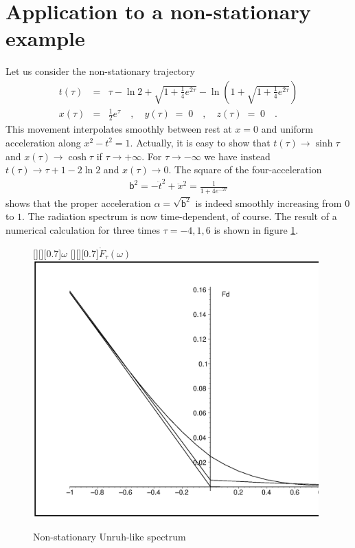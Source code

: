 \documentclass[a4paper,12pt]{article}
\newcommand{\Fd}{\dot F_{\tau}(\omega)}
\newcommand{\vvb}{\mathsf b}
\begin{document}
\section{Application to a non-stationary example}

Let us consider the non-stationary trajectory
\begin{eqnarray}
\label{eq:nonstat}
t(\tau)&=&\tau-\ln2+\sqrt{1+\frac{1}{4}e^{2\tau}}-
\ln\left(1+\sqrt{1+\frac{1}{4}e^{2\tau}}\right)\nonumber\\
x(\tau)&=&\frac{1}{2}e^\tau\quad,\quad y(\tau)\;=\;0\quad,\quad z(\tau)\;=\;0
\quad.
\end{eqnarray}
This movement interpolates smoothly between rest at $x=0$ and uniform acceleration along
$x^2-t^2=1$. Actually, it is easy to show that $t(\tau)\to\sinh\tau$ and 
$x(\tau)\to\cosh\tau$ if $\tau\to +\infty$. For $\tau\to -\infty$ we have instead
$t(\tau)\to \tau+1-2\ln2$ and $x(\tau)\to0$. The square of the four-acceleration
\begin{eqnarray*}
\vvb^2=-\ddot{t}^2+\ddot{x}^2=\frac{1}{1+4e^{-2\tau}}
\end{eqnarray*}
shows that the proper acceleration $\alpha=\sqrt{\vvb^2}$ is indeed smoothly increasing
from $0$ to $1$. The radiation spectrum is now time-dependent, of course. The result
of a numerical calculation for three times $\tau=-4,1,6$ is shown in figure \ref{huspe}.
\begin{figure}[htbp]
\begin{center}
[][][0.7]{$\omega$}
[][][0.7]{$\Fd$}
\includegraphics[width=11cm]{fig2.eps}
\caption{Non-stationary Unruh-like spectrum}\label{huspe}
\end{center}
\end{figure}
\end{document}
